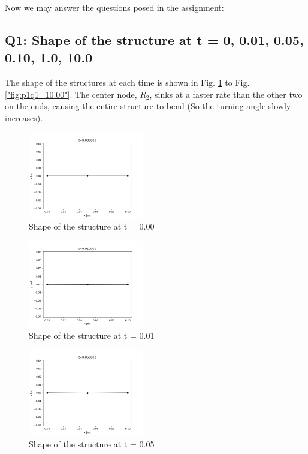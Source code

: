 \documentclass[letterpaper, 10 pt, conference]{ieeeconf}  %
\begin{document}
Now we may answer the questions posed in the assignment:

\subsection*{Q1: Shape of the structure at t = {0, 0.01, 0.05, 0.10, 1.0, 10.0}}


The shape of the structures at each time is shown in Fig. \ref{"fig:p1q1_0.00"} to Fig. \ref{"fig:p1q1_10.00"}. The center node, $R_2$, sinks at a faster rate than the other two on the ends, causing the entire structure to bend (So the turning angle slowly increases). 

\begin{figure}[!ht]
        \centering
        \includegraphics[width=0.45\textwidth,keepaspectratio]{p1q1_implicit_0.00.png}
        \caption{Shape of the structure at t = 0.00}
        \label{"fig:p1q1_0.00"}
\end{figure}

\begin{figure}[!ht]
        \centering
        \includegraphics[width=0.45\textwidth,keepaspectratio]{p1q1_implicit_0.01.png}
        \caption{Shape of the structure at t = 0.01}
        \label{"fig:p1q1_0.01"}
\end{figure}


\begin{figure}[!ht]
        \centering
        \includegraphics[width=0.45\textwidth,keepaspectratio]{p1q1_implicit_0.05.png}
        \caption{Shape of the structure at t = 0.05}
        \label{"fig:p1q1_0.05"}
\end{figure}
\end{document}
